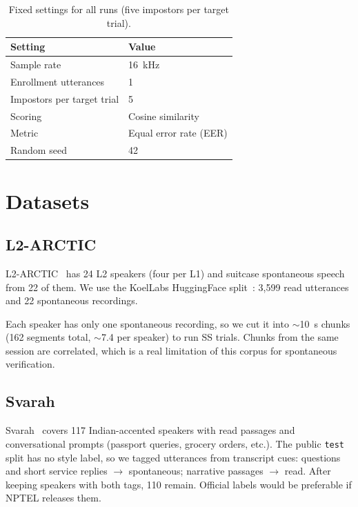 \documentclass[cameraready]{Interspeech}
\begin{document}
\begin{table}[H]
  \caption{Fixed settings for all runs (five impostors per target trial).}
  \label{tab:protocol}
  \centering
  \begin{tabular}{ll}
    \toprule
    Setting & Value \\
    \midrule
    Sample rate & \SI{16}{\kilo\hertz} \\
    Enrollment utterances & 1 \\
    Impostors per target trial & 5 \\
    Scoring & Cosine similarity \\
    Metric & Equal error rate (EER) \\
    Random seed & 42 \\
    \bottomrule
  \end{tabular}
\end{table}

\section{Datasets}
\label{sec:datasets}

\subsection{L2-ARCTIC}

L2-ARCTIC~\cite{zhao2018l2arctic} has 24 L2 speakers (four per L1) and suitcase spontaneous speech from 22 of them. We use the KoelLabs HuggingFace split~\cite{koellabs2024l2arctic}: 3{,}599 read utterances and 22 spontaneous recordings.

Each speaker has only one spontaneous recording, so we cut it into $\sim$\SI{10}{\second} chunks (162 segments total, $\sim$7.4 per speaker) to run SS trials. Chunks from the same session are correlated, which is a real limitation of this corpus for spontaneous verification.

\subsection{Svarah}

Svarah~\cite{javed2023svarah} covers 117 Indian-accented speakers with read passages and conversational prompts (passport queries, grocery orders, etc.). The public \texttt{test} split has no style label, so we tagged utterances from transcript cues: questions and short service replies $\rightarrow$ spontaneous; narrative passages $\rightarrow$ read. After keeping speakers with both tags, 110 remain. Official labels would be preferable if NPTEL releases them.
\end{document}
